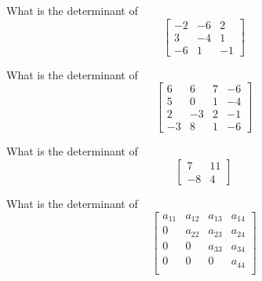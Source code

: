 \eexo{}


\bexo
What is the determinant of 
\begin{equation*}
\left[
\begin{array}{ccc}
    -2 &   -6  &   2\\
     3 &   -4  &   1\\
    -6 &    1  &  -1
\end{array}
\right]
\end{equation*}

\eexo{}

\bexo
What is the determinant of 
\begin{equation*}
\left[
\begin{array}{cccc}
     6  &   6  &   7 &   -6\\
     5  &   0  &   1 &   -4\\
     2  &  -3  &   2 &   -1\\
    -3  &   8  &   1 &   -6
\end{array}
\right]
\end{equation*}

\eexo{}

\bexo
What is the determinant of 
\[
\left[
\begin{array}{cc}
7 & 11\\
-8 & 4
\end{array}
\right]
\]
\eexo{}

\bexo
What is the determinant of 
\[
\left[
\begin{array}{cccc}
a_{11} & a_{12} & a_{13} & a_{14}\\
0 & a_{22} & a_{23} & a_{24}\\
0 & 0 & a_{33} & a_{34}\\
0 & 0 & 0 & a_{44}\\
\end{array}
\right]
\]
\eexo{}

